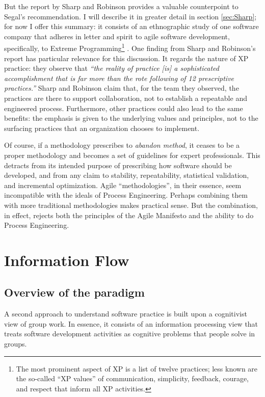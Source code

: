 But the report by Sharp and Robinson provides a valuable counterpoint to Segal's recommendation. I will describe it in greater detail in section \ref{sec:Sharp}; for now I offer this summary: it consists of an ethnographic study of one software company that adheres in letter and spirit to agile software development, specifically, to Extreme Programming\footnote{The most prominent aspect of XP is a list of twelve practices; less known are the so-called ``XP values'' of communication, simplicity, feedback, courage, and respect that inform all XP activities.} \cite{Beck1999}. One finding from Sharp and Robinson's report has particular relevance for this discussion. It regards the nature of XP practice: they observe that \emph{``the reality of practice [is] a sophisticated accomplishment that is far more than the rote following of 12 prescriptive practices.''} Sharp and Robinson claim that, for the team they observed, the practices are there to support collaboration, not to establish a repeatable and engineered process. Furthermore, other practices could also lead to the same benefits: the emphasis is given to the underlying values and principles, not to the surfacing practices that an organization chooses to implement.

Of course, if a methodology prescribes to \emph{abandon method}, it ceases to be a proper methodology and becomes a set of guidelines for expert professionals. This detracts from its intended purpose of prescribing how software should be developed, and from any claim to stability, repeatability, statistical validation, and incremental optimization. Agile ``methodologies'', in their essence, seem incompatible with the ideals of Process Engineering. Perhaps combining them with more traditional methodologies makes practical sense. But the combination, in effect, rejects both the principles of the Agile Manifesto and the ability to do Process Engineering.


\section{Information Flow}
\label{sec:InfoFlow}

\subsection{Overview of the paradigm}

A second approach to understand software practice is built upon a cognitivist view of group work. In essence, it consists of an information processing view \cite{Galbraith1974} that treats software development activities as cognitive problems that people solve in groups.

